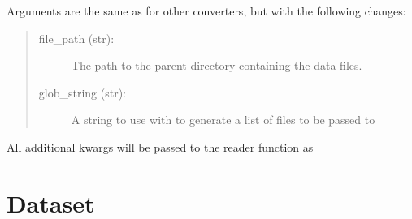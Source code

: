 \documentclass[letterpaper,10pt,english]{sphinxmanual}
\begin{document}
\begin{fulllineitems}

\begin{fulllineitems}
\label{\detokenize{converters:colabfit.tools.converters.FolderConverter._load}}
\sphinxAtStartPar
Arguments are the same as for other converters, but with the following
changes:
\begin{quote}
\begin{description}
\item[{file\_path (str):}] \leavevmode
\sphinxAtStartPar
The path to the parent directory containing the data files.

\item[{glob\_string (str):}] \leavevmode
\sphinxAtStartPar
A string to use with  to
generate a list of files to be passed to 

\end{description}
\end{quote}

\sphinxAtStartPar
All additional kwargs will be passed to the reader function as

\end{fulllineitems}


\end{fulllineitems}

\label{\detokenize{dataset:module-colabfit.tools.dataset}}

\section{Dataset}
\label{\detokenize{dataset:dataset}}\label{\detokenize{dataset::doc}}
\end{document}
